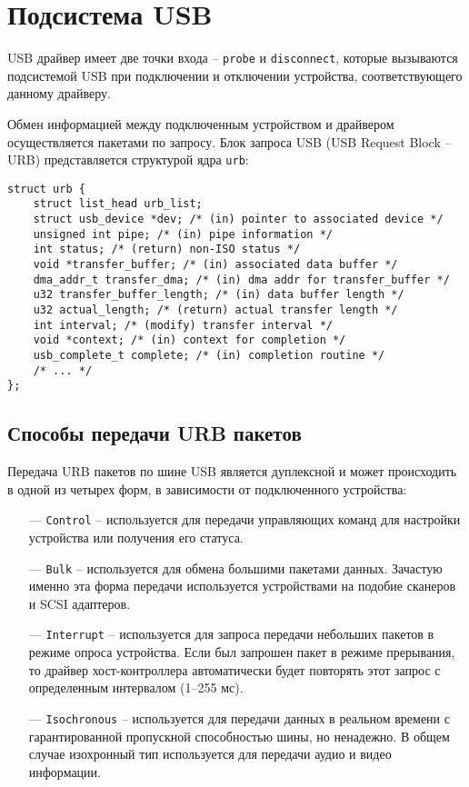 \section{Подсистема USB}

USB драйвер имеет две точки входа -- \texttt{probe} и \texttt{disconnect}, которые вызываются подсистемой USB при подключении и отключении устройства, соответствующего данному драйверу.

Обмен информацией между подключенным устройством и драйвером осуществляется пакетами по запросу. Блок запроса USB (USB Request Block -- URB) представляется структурой ядра \texttt{urb}:

\begin{small}
\begin{verbatim}
struct urb {
    struct list_head urb_list;
    struct usb_device *dev; /* (in) pointer to associated device */
    unsigned int pipe; /* (in) pipe information */
    int status; /* (return) non-ISO status */
    void *transfer_buffer; /* (in) associated data buffer */
    dma_addr_t transfer_dma; /* (in) dma addr for transfer_buffer */
    u32 transfer_buffer_length; /* (in) data buffer length */
    u32 actual_length; /* (return) actual transfer length */
    int interval; /* (modify) transfer interval */
    void *context; /* (in) context for completion */
    usb_complete_t complete; /* (in) completion routine */
    /* ... */
};
\end{verbatim}
\end{small}

\subsection{Способы передачи URB пакетов}

Передача URB пакетов по шине USB является дуплексной и может происходить в одной из четырех форм, в зависимости от подключенного устройства:

\begin{itemize}[leftmargin=1.6\parindent]
    \item[---] \texttt{Control} -- используется для передачи управляющих команд для настройки устройства или получения его статуса.
    \item[---] \texttt{Bulk} -- используется для обмена большими пакетами данных. Зачастую именно эта форма передачи используется устройствами на подобие сканеров и SCSI адаптеров.
    \item[---] \texttt{Interrupt} -- используется для запроса передачи небольших пакетов в режиме опроса устройства. Если был запрошен пакет в режиме прерывания, то драйвер хост-контроллера автоматически будет повторять этот запрос с определенным интервалом (1--255 мс).
    \item[---] \texttt{Isochronous} -- используется для передачи данных в реальном времени с гарантированной пропускной способностью шины, но ненадежно. В общем случае изохронный тип используется для передачи аудио и видео информации. 
\end{itemize}

